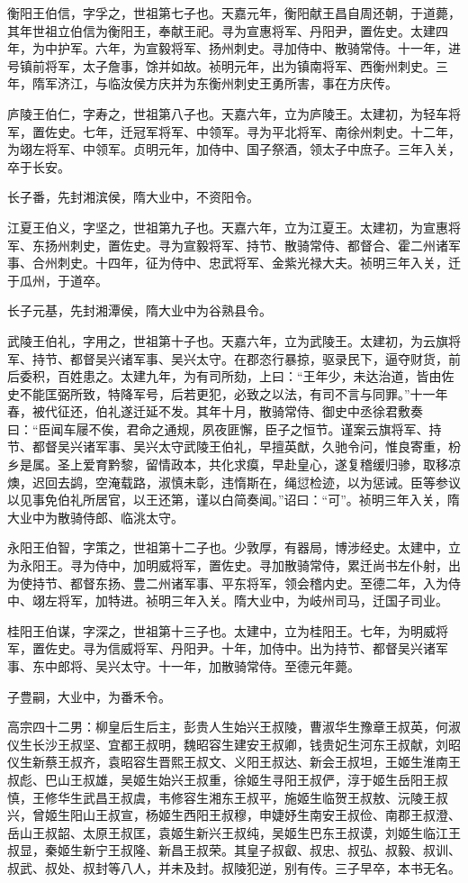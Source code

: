 \documentclass[]{article}
\begin{document}
衡阳王伯信，字孚之，世祖第七子也。天嘉元年，衡阳献王昌自周还朝，于道薨，其年世祖立伯信为衡阳王，奉献王祀。寻为宣惠将军、丹阳尹，置佐史。太建四年，为中护军。六年，为宣毅将军、扬州刺史。寻加侍中、散骑常侍。十一年，进号镇前将军，太子詹事，馀并如故。祯明元年，出为镇南将军、西衡州刺史。三年，隋军济江，与临汝侯方庆并为东衡州刺史王勇所害，事在方庆传。

庐陵王伯仁，字寿之，世祖第八子也。天嘉六年，立为庐陵王。太建初，为轻车将军，置佐史。七年，迁冠军将军、中领军。寻为平北将军、南徐州刺史。十二年，为翊左将军、中领军。贞明元年，加侍中、国子祭酒，领太子中庶子。三年入关，卒于长安。

长子番，先封湘滨侯，隋大业中，不资阳令。

江夏王伯义，字坚之，世祖第九子也。天嘉六年，立为江夏王。太建初，为宣惠将军、东扬州刺史，置佐史。寻为宣毅将军、持节、散骑常侍、都督合、霍二州诸军事、合州刺史。十四年，征为侍中、忠武将军、金紫光禄大夫。祯明三年入关，迁于瓜州，于道卒。

长子元基，先封湘潭侯，隋大业中为谷熟县令。

武陵王伯礼，字用之，世祖第十子也。天嘉六年，立为武陵王。太建初，为云旗将军、持节、都督吴兴诸军事、吴兴太守。在郡恣行暴掠，驱录民下，逼夺财货，前后委积，百姓患之。太建九年，为有司所劾，上曰：``王年少，未达治道，皆由佐史不能匡弼所致，特降军号，后若更犯，必致之以法，有司不言与同罪。''十一年春，被代征还，伯礼遂迁延不发。其年十月，散骑常侍、御史中丞徐君敷奏曰：``臣闻车屦不俟，君命之通规，夙夜匪懈，臣子之恒节。谨案云旗将军、持节、都督吴兴诸军事、吴兴太守武陵王伯礼，早擅英猷，久驰令问，惟良寄重，枌乡是属。圣上爱育黔黎，留情政本，共化求瘼，早赴皇心，遂复稽缓归骖，取移凉燠，迟回去鹢，空淹载路，淑慎未彰，违惰斯在，绳愆检迹，以为惩诫。臣等参议以见事免伯礼所居官，以王还第，谨以白简奏闻。''诏曰：``可''。祯明三年入关，隋大业中为散骑侍郎、临洮太守。

永阳王伯智，字策之，世祖第十二子也。少敦厚，有器局，博涉经史。太建中，立为永阳王。寻为侍中，加明威将军，置佐史。寻加散骑常侍，累迁尚书左仆射，出为使持节、都督东扬、豊二州诸军事、平东将军，领会稽内史。至德二年，入为侍中、翊左将军，加特进。祯明三年入关。隋大业中，为岐州司马，迁国子司业。

桂阳王伯谋，字深之，世祖第十三子也。太建中，立为桂阳王。七年，为明威将军，置佐史。寻为信威将军、丹阳尹。十年，加侍中。出为持节、都督吴兴诸军事、东中郎将、吴兴太守。十一年，加散骑常侍。至德元年薨。

子豊嗣，大业中，为番禾令。

高宗四十二男：柳皇后生后主，彭贵人生始兴王叔陵，曹淑华生豫章王叔英，何淑仪生长沙王叔坚、宜都王叔明，魏昭容生建安王叔卿，钱贵妃生河东王叔献，刘昭仪生新蔡王叔齐，袁昭容生晋熙王叔文、义阳王叔达、新会王叔坦，王姬生淮南王叔彪、巴山王叔雄，吴姬生始兴王叔重，徐姬生寻阳王叔俨，淳于姬生岳阳王叔慎，王修华生武昌王叔虞，韦修容生湘东王叔平，施姬生临贺王叔敖、沅陵王叔兴，曾姬生阳山王叔宣，杨姬生西阳王叔穆，申婕妤生南安王叔俭、南郡王叔澄、岳山王叔韶、太原王叔匡，袁姬生新兴王叔纯，吴姬生巴东王叔谟，刘姬生临江王叔显，秦姬生新宁王叔隆、新昌王叔荣。其皇子叔叡、叔忠、叔弘、叔毅、叔训、叔武、叔处、叔封等八人，并未及封。叔陵犯逆，别有传。三子早卒，本书无名。
\end{document}
